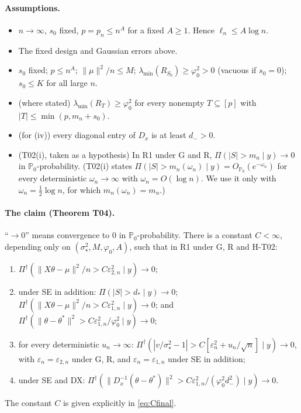 \documentclass[11pt]{article}
\theoremstyle{remark}
\renewcommand{\P}{\mathbb P}
\newcommand{\Pd}{\Pi^\dagger}
\newcommand{\ve}{\varepsilon}
\newcommand{\sst}{\sigma_\star}
\begin{document}
\paragraph{Assumptions.}
\begin{itemize}[leftmargin=2.2em]
\item[R1] $n\to\infty$, $s_0$ fixed, $p=p_n\le n^A$ for a fixed $A\ge1$. Hence $\ell_n\le A\log n$.
\item[G] The fixed design and Gaussian errors above.
\item[R] $s_0$ fixed; $p\le n^A$; $\|\mu\|^2/n\le M$; $\lambda_{\min}(R_{S_0})\ge\varphi_0^2>0$ (vacuous if $s_0=0$); $s_0\le K$ for all large $n$.
\item[SE] (where stated) $\lambda_{\min}(R_T)\ge\varphi_0^2$ for every nonempty $T\subseteq[p]$ with $|T|\le\min(p,m_n+s_0)$.
\item[DX] (for (iv)) every diagonal entry of $D_x$ is at least $d_->0$.
\item[H-T02] (T02(i), taken as a hypothesis) In R1 under G and R, $\Pi(|S|>m_n\mid y)\to0$ in $\P_0$-probability. (T02(i) states $\Pi(|S|>m_n(\omega_n)\mid y)=O_{\P_0}(e^{-\omega_n})$ for every deterministic $\omega_n\to\infty$ with $\omega_n=O(\log n)$. We use it only with $\omega_n=\frac12\log n$, for which $m_n(\omega_n)=m_n$.)
\end{itemize}

\paragraph{The claim (Theorem T04).} ``$\to0$'' means convergence to $0$ in $\P_0$-probability. There is a constant $C<\infty$, depending only on $(\sst^2,M,\varphi_0,A)$, such that in R1 under G, R and H-T02:
\begin{enumerate}[label=(\roman*)]
\item $\Pd(\|X\theta-\mu\|^2/n>C\ve_{2,n}^2\mid y)\to0$;
\item under SE in addition: $\Pi(|S|>d_\ast\mid y)\to0$; $\Pd(\|X\theta-\mu\|^2/n>C\ve_{1,n}^2\mid y)\to0$; and $\Pd(\|\theta-\theta^\ast\|^2>C\ve_{1,n}^2/\varphi_0^2\mid y)\to0$;
\item for every deterministic $u_n\to\infty$: $\Pd(|v/\sst^2-1|>C[\ve_n^2+u_n/\sqrt n]\mid y)\to0$, with $\ve_n=\ve_{2,n}$ under G, R, and $\ve_n=\ve_{1,n}$ under SE in addition;
\item under SE and DX: $\Pd(\|D_x^{-1}(\theta-\theta^\ast)\|^2>C\ve_{1,n}^2/(\varphi_0^2d_-^2)\mid y)\to0$.
\end{enumerate}
The constant $C$ is given explicitly in \eqref{eq:Cfinal}.
\end{document}
